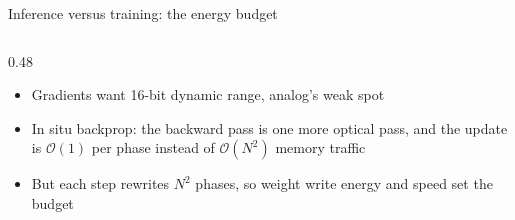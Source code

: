 \documentclass[aspectratio=169,10pt]{beamer}
\begin{document}
\begin{frame}{Inference versus training: the energy budget}
\begin{columns}[T]
\begin{column}{0.48\textwidth}
{\begin{itemize}
  \item Gradients want 16-bit dynamic range, analog's weak spot
  \item In situ backprop: the backward pass is one more optical pass, and the update is $\mathcal{O}(1)$ per phase instead of $\mathcal{O}(N^2)$ memory traffic
  \item But each step rewrites $N^2$ phases, so weight write energy and speed set the budget
\end{itemize}
}
\end{column}
\end{columns}
\end{frame}
\end{document}

